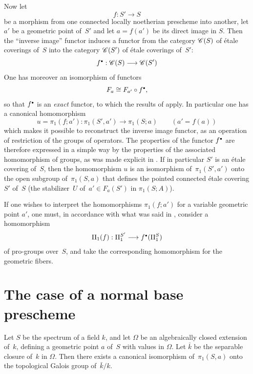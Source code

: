 Now let
$$
f\colon S'\to S
$$
be a morphism from one connected locally noetherian prescheme
into another, let $a'$ be a geometric point of~$S'$ and let
$a=f(a')$ be its direct image in $S$. Then the ``inverse
image'' functor induces a functor from the category $\cal{C}(S)$
of \'etale coverings of~$S$ into the category
$\cal{C}(S')$ of \'etale coverings of~$S'$:
$$
f^\bbullet:\cal{C}(S)\to \cal{C}(S')
$$
One has moreover an isomorphism of functors
$$
F_a\cong F_{a'}\circ f^{\scriptscriptstyle\bullet},
$$
so that $f^{\scriptscriptstyle\bullet}$ is an \emph{exact} functor, to which
the results of \No {} apply. In particular one has a
canonical homomorphism
$$
u=\pi_1(f;a'):\pi_1(S',a')\to \pi_1(S;a) \qquad (a'=f(a))
$$
which makes it possible to reconstruct the inverse image functor, as an
operation of restriction of the groups of operators. The
properties of the functor $f^{\scriptscriptstyle\bullet}$ are therefore expressed in a
simple way by the properties of the associated homomorphism of
groups, as was made explicit in
\No {}. If in particular $S'$ is an \'etale covering of~$S$,
then the homomorphism $u$ is an isomorphism of~$\pi_1(S',a')$ onto the
open subgroup of~$\pi_1(S,a)$ that defines the pointed connected
\'etale covering $S'$ of~$S$ (\ie the stabilizer~$U$
of~$a'\in F_a(S')$ in $\pi_1(S;A)$).

If one wishes to interpret the homomorphisms $\pi_1(f;a')$ for
a variable geometric point $a'$, one must, in accordance
with what was said in \No {}, consider a
homomorphism
$$
\Pi_1(f):\Pi_1^{S'}\to f^\bbullet(\Pi_1^S)
$$
of pro-groups over~$S$, and take the corresponding homomorphism for
the geometric fibers.

\section{The case of a normal base prescheme}
\label{V.8}
\begin{proposition}
\label{V.8.1}
Let $S$ be the spectrum of a field $k$, and let $\Omega$ be an
algebraically closed extension of~$k$, defining a geometric
point $a$ of~$S$ with values in $\Omega$. Let
$\bar{k}$ be the separable closure of~$k$ in $\Omega$. Then there
exists a canonical isomorphism of~$\pi_1(S,a)$ onto the topological
Galois group of~$\bar{k}/k$.
\end{proposition}

